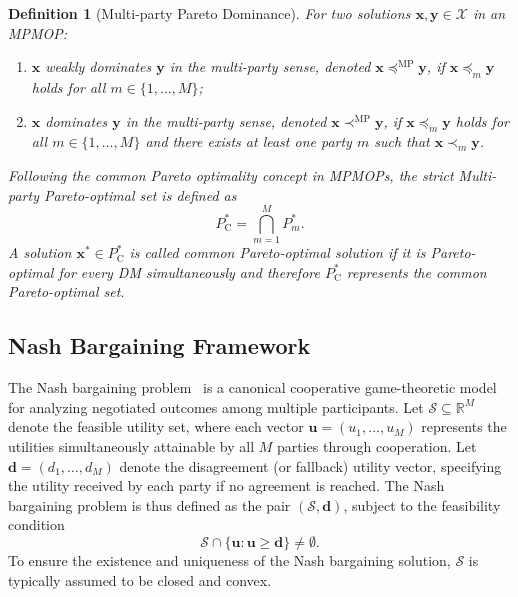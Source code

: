 \documentclass[journal]{IEEEtran}
\newtheorem{definition}{Definition}
\begin{document}
\begin{definition}[Multi-party Pareto Dominance]
	\label{def:multi_party_pareto_dominance}
	For two solutions $\mathbf{x}, \mathbf{y} \in \mathcal{X}$ in an MPMOP:
	\begin{enumerate}
		\item $\mathbf{x}$ weakly dominates $\mathbf{y}$ in the multi-party sense, denoted $\mathbf{x} \preceq^{\mathrm{MP}} \mathbf{y}$, if $\mathbf{x} \preceq_m \mathbf{y}$ holds for all $m \in \{1,\dots,M\}$;
		\item $\mathbf{x}$ dominates $\mathbf{y}$ in the multi-party sense, denoted $\mathbf{x} \prec^{\mathrm{MP}} \mathbf{y}$, if $\mathbf{x} \preceq_m \mathbf{y}$ holds for all $m \in \{1,\dots,M\}$ and there exists at least one party $m$ such that $\mathbf{x} \prec_m \mathbf{y}$.
	\end{enumerate}
	
	Following the common Pareto optimality concept in MPMOPs, the strict Multi-party Pareto-optimal set is defined as 
	\[ 
	P_{\mathrm{C}}^* = \bigcap_{m=1}^{M} P_m^*.
	\] 
	A solution $\mathbf{x}^*\in P_{\mathrm{C}}^*$ is called common Pareto-optimal solution if it is Pareto-optimal for every DM simultaneously and therefore $P_{\mathrm{C}}^*$ represents the common Pareto-optimal set.
\end{definition}

\subsection{Nash Bargaining Framework}

The Nash bargaining problem~\cite{nash1950bargaining} is a canonical cooperative game-theoretic model for analyzing negotiated outcomes among multiple participants. Let $\mathcal{S} \subseteq \mathbb{R}^M$ denote the feasible utility set, where each vector $\mathbf{u} = (u_1,\ldots,u_M)$ represents the utilities simultaneously attainable by all $M$ parties through cooperation. Let $\mathbf{d} = (d_1,\ldots,d_M)$ denote the disagreement (or fallback) utility vector, specifying the utility received by each party if no agreement is reached. The Nash bargaining problem is thus defined as the pair $(\mathcal{S}, \mathbf{d})$, subject to the feasibility condition
\[
\mathcal{S} \cap \{\mathbf{u} : \mathbf{u} \ge \mathbf{d}\} \neq \emptyset.
\]
To ensure the existence and uniqueness of the Nash bargaining solution, $\mathcal{S}$ is typically assumed to be closed and convex.
\end{document}
